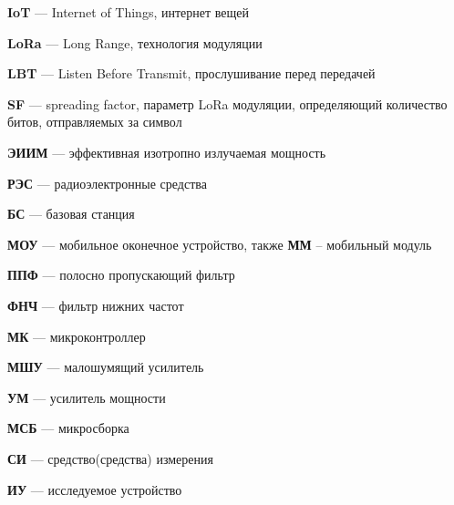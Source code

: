
{
\noindent \textbf{IoT} --- Internet of Things, интернет вещей

\noindent \textbf{LoRa} --- Long Range, технология модуляции

\noindent \textbf{LBT} --- Listen Before Transmit, прослушивание перед передачей

\noindent \textbf{SF} --- spreading factor, параметр LoRa модуляции, определяющий количество битов, отправляемых за символ

\noindent \textbf{ЭИИМ} --- эффективная изотропно излучаемая мощность

\noindent \textbf{РЭС} --- радиоэлектронные средства

\noindent \textbf{БС} --- базовая станция

\noindent \textbf{МОУ} --- мобильное оконечное устройство, также \textbf{ММ} – мобильный модуль

\noindent \textbf{ППФ} --- полосно пропускающий фильтр

\noindent \textbf{ФНЧ} --- фильтр нижних частот

\noindent \textbf{МК} --- микроконтроллер

\noindent \textbf{МШУ} --- малошумящий усилитель

\noindent \textbf{УМ} --- усилитель мощности

\noindent \textbf{МСБ} --- микросборка

\noindent \textbf{СИ} --- средство(средства) измерения

\noindent \textbf{ИУ} --- исследуемое устройство
}